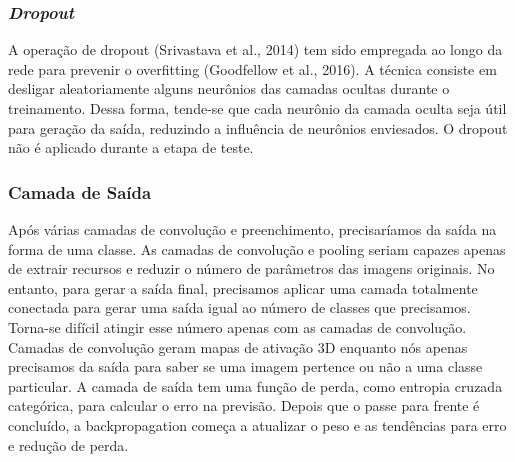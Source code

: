\subsubsection{\textit{Dropout}}

A operação de dropout (Srivastava et al., 2014) tem sido empregada ao longo da rede para prevenir o overfitting (Goodfellow et al., 2016). A técnica consiste em desligar aleatoriamente alguns neurônios das camadas ocultas durante o treinamento. Dessa forma, tende-se que cada neurônio da camada oculta seja útil para geração da saída, reduzindo a influência de neurônios enviesados. O dropout não é aplicado durante a etapa de teste.

\subsubsection{Camada de Saída}

Após várias camadas de convolução e preenchimento, precisaríamos da saída na forma de uma classe. As camadas de convolução e pooling seriam capazes apenas de extrair recursos e reduzir o número de parâmetros das imagens originais. No entanto, para gerar a saída final, precisamos aplicar uma camada totalmente conectada para gerar uma saída igual ao número de classes que precisamos. Torna-se difícil atingir esse número apenas com as camadas de convolução. Camadas de convolução geram mapas de ativação 3D enquanto nós apenas precisamos da saída para saber se uma imagem pertence ou não a uma classe particular. A camada de saída tem uma função de perda, como entropia cruzada categórica, para calcular o erro na previsão. Depois que o passe para frente é concluído, a backpropagation começa a atualizar o peso e as tendências para erro e redução de perda.
